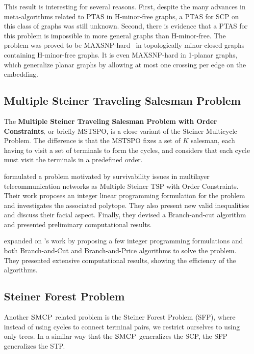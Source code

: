 This result is interesting for several reasons. First, despite the many advances in meta-algorithms related to PTAS in H-minor-free graphs, a PTAS for SCP on this class of graphs was still unknown. Second, there is evidence that a PTAS for this problem is impossible in more general graphs than H-minor-free. 
The problem was proved to be MAXSNP-hard~\cite{subset-tsp-is-maxsnp-hard} in topologically minor-closed graphs containing H-minor-free graphs. It is even MAXSNP-hard in 1-planar graphs, which generalize planar graphs by allowing at most one crossing per edge on the embedding.


\subsection{Multiple Steiner Traveling Salesman Problem}

The \textbf{Multiple Steiner Traveling Salesman Problem with Order Constraints}, or briefly MSTSPO, is a close variant of the Steiner Multicycle Problem. The difference is that the MSTSPO fixes a set of \(K\) salesman, each having to visit a set of terminals to form the cycles, and considers that each cycle must visit the terminals in a predefined order.

\cite{BORNE2013487} formulated a problem motivated by survivability issues in multilayer telecommunication networks as Multiple Steiner TSP with Order Constraints. Their work proposes an integer linear programming formulation for the problem and investigates the associated polytope. They also present new valid inequalities and discuss their facial aspect. Finally, they devised a Branch-and-cut algorithm and presented preliminary computational results.

\cite{Gabrel2020} expanded on \citeauthor{BORNE2013487}'s work by proposing a few integer programming formulations and both Branch-and-Cut and Branch-and-Price algorithms to solve the problem. They presented extensive computational results, showing the efficiency of the algorithms.

\subsection{Steiner Forest Problem}

Another \(\textsc{SMCP}\) related problem is the Steiner Forest Problem (SFP), where instead of using cycles to connect terminal pairs, we restrict ourselves to using only trees. In a similar way that the \(\textsc{SMCP}\) generalizes the SCP, the SFP generalizes the STP. 

